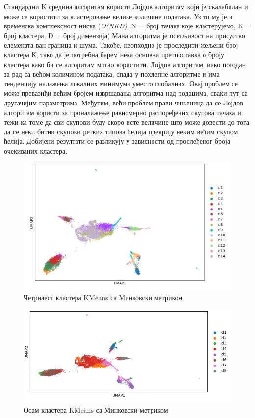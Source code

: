 \documentclass[10pt, a4paper]{article}
\begin{document}
Стандардни K средина алгоритам користи Лојдов алгоритам који је скалабилан и може се користити за кластеровање велике количине података. Уз то му је и временска комплексност ниска ({\em O(NKD)}, N = број тачака које кластерујемо, K = број кластера, D = број димензија).Мана алгоритма је осетљивост на присуство елемената ван граница и шума. Такође, неопходно је проследити жељени број кластера К, тако да је потребна барем нека основна претпоставка о броју кластера како би се алгоритам могао користити. Лојдов алгоритам, иако погодан за рад са већом количином података, спада у похлепне алгоритме и има тенденцију налажења локалних минимума уместо глобалних. Овај проблем се може превазиђи већим бројем извршавања алгоритма над подацима, сваки пут са другачијим параметрима. Међутим, већи проблем прави чињеница да се Лојдов алгоритам користи за проналажење равномерно распоређених скупова тачака и тежи ка томе да сви скупови буду скоро исте величине што може довести до тога да се неки битни скупови ретких типова ћелија прекрију неким већим скупом ћелија. Добијени резултати се разликују у зависности од прослеђеног броја очекиваних кластера.
\begin{figure}[H]
    \centering
    \captionsetup{justification=centering}
    \includegraphics[width=\textwidth]{kmeans_euc.png}
    \caption{Четрнаест кластера KMeans са Минковски метриком}
    \label{fig:gustina2}
\end{figure}

\begin{figure}[H]
    \centering
    \captionsetup{justification=centering}
    \includegraphics[width=\textwidth]{kmeansmink.png}
    \caption{Осам кластера KMeans са Минковски метриком}
    \label{fig:gustina2}
\end{figure}
\newpage
\end{document}
